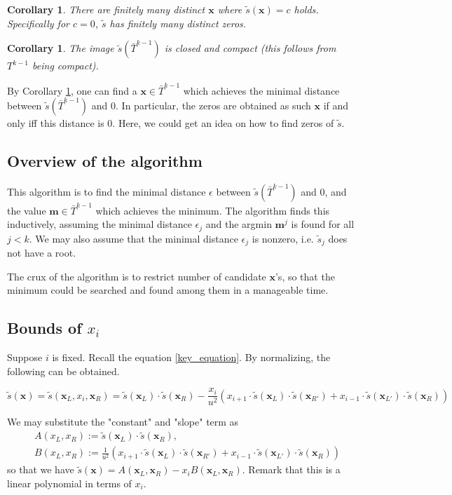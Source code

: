 \documentclass{article}
\theoremstyle{definition}
\theoremstyle{plain}
\newtheorem{corollary}[theorem]{Corollary}
\theoremstyle{remark}
\numberwithin{equation}{section}
\begin{document}
\begin{corollary}
  There are finitely many distinct $\mathbf{x}$ where $\tilde{s}(\mathbf{x}) = c$ holds.
  Specifically for $c = 0$, $\tilde{s}$ has finitely many distinct zeros.
\end{corollary}

\begin{corollary}\label{image_compact}
  The image $\tilde{s}(\bar{T}^{k-1})$ is closed and compact (this follows from $T^{k-1}$ being compact).
\end{corollary}

By Corollary \ref{image_compact}, one can find a $\mathbf{x} \in \bar{T}^{k-1}$
which achieves the minimal distance between $\tilde{s}(\bar{T}^{k-1})$ and $0$.
In particular, the zeros are obtained as such $\mathbf{x}$ if and only iff this distance is $0$.
Here, we could get an idea on how to find zeros of $\tilde{s}$.

\subsection{Overview of the algorithm}

This algorithm is to find the minimal distance $\epsilon$ between $\tilde{s}(\bar{T}^{k-1})$ and $0$,
and the value $\mathbf{m} \in \bar{T}^{k-1}$ which achieves the minimum.
The algorithm finds this inductively,
assuming the minimal distance $\epsilon_j$ and the argmin $\mathbf{m}^j$ is found for all $j < k$.
We may also assume that the minimal distance $\epsilon_j$ is nonzero,
i.e. $\tilde{s}_j$ does not have a root.

The crux of the algorithm is to restrict number of candidate $\mathbf{x}$'s,
so that the minimum could be searched and found among them in a manageable time.

\subsection{Bounds of $x_i$}

Suppose $i$ is fixed.
Recall the equation \eqref{key_equation}.
By normalizing, the following can be obtained.

\[
  \tilde{s}(\mathbf{x}) = \tilde{s}(\mathbf{x}_L, x_i, \mathbf{x}_R) =
  \tilde{s}(\mathbf{x}_L) \cdot \tilde{s}(\mathbf{x}_R)
  - \frac{x_i}{u^2}
  (x_{i+1} \cdot \tilde{s}(\mathbf{x}_L) \cdot \tilde{s}(\mathbf{x}_{R'})
  + x_{i-1} \cdot \tilde{s}(\mathbf{x}_{L'}) \cdot \tilde{s}(\mathbf{x}_R))
\]

We may substitute the "constant" and "slope" term as
\begin{align*}
  & A(x_L, x_R) := \tilde{s}(\mathbf{x}_L) \cdot \tilde{s}(\mathbf{x}_R),\\
  & B(x_L, x_R) := \frac{1}{u^2}
  (x_{i+1} \cdot \tilde{s}(\mathbf{x}_L) \cdot \tilde{s}(\mathbf{x}_{R'})
  + x_{i-1} \cdot \tilde{s}(\mathbf{x}_{L'}) \cdot \tilde{s}(\mathbf{x}_R))
\end{align*}
so that we have $\tilde{s}(\mathbf{x}) = A(\mathbf{x}_L, \mathbf{x}_R) - x_i B(\mathbf{x}_L, \mathbf{x}_R)$.
Remark that this is a linear polynomial in terms of $x_i$.
\end{document}
